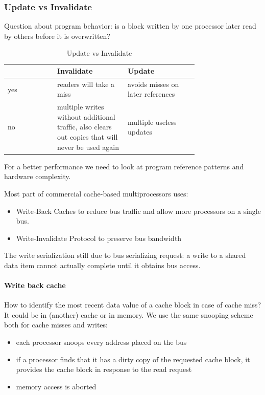 \subsubsection{Update vs Invalidate}
Question about program behavior: is a block written by one processor later read by others before it is overwritten?
\begin{table}[h]
    \centering
    \begin{tabular}{l|p{0.37\linewidth}p{0.37\linewidth}}
        \toprule
         & \textbf{Invalidate} & \textbf{Update} \\
        \midrule
        yes & readers will take a miss & avoids misses on later references \\
        \midrule
        no & multiple writes without additional traffic, also clears out copies that will never be used again &
        multiple useless updates \\
        \bottomrule
    \end{tabular}
    \caption{Update vs Invalidate}
    \label{tab:update-vs-invalidate}
\end{table}
For a better performance we need to look at program reference patterns and hardware complexity.

Most part of commercial cache-based
multiprocessors uses:
\begin{itemize}
    \item Write-Back Caches to reduce bus traffic and
allow more processors on a single bus.
    \item Write-Invalidate Protocol to preserve bus
bandwidth
\end{itemize}

The write serialization still due to bus serializing request: a write to a shared data item cannot actually
complete until it obtains bus access.

\paragraph{Write back cache}
How to identify the most recent data value of a cache block in case of cache miss?
It could be in (another) cache or in memory.
We use the same snooping scheme both for cache misses and writes:
\begin{itemize}
    \item each processor snoops every address placed on the bus
    \item if a processor finds that it has a dirty copy of the
    requested cache block, it provides the cache block
    in response to the read request
    \item memory access is aborted
\end{itemize}

